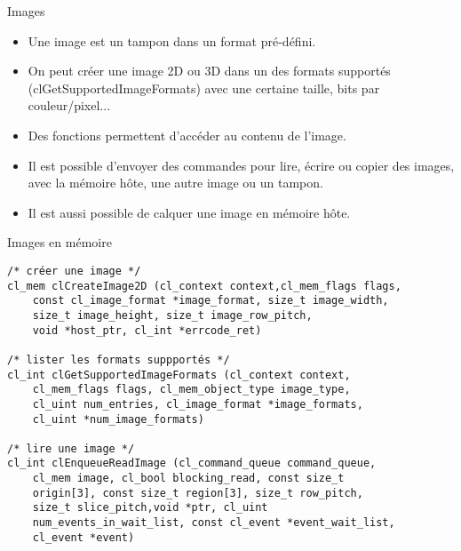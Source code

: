 \documentclass[10pt]{beamer}
\begin{document}
\begin{frame}{Images}

  \begin{itemize}
    \item Une image est un tampon dans un format pré-défini.

    \item On peut créer une image 2D ou 3D dans un des formats supportés (clGetSupportedImageFormats) avec une certaine taille, bits par couleur/pixel...

    \item Des fonctions permettent d'accéder au contenu de l'image.

    \item Il est possible d'envoyer des commandes pour lire, écrire ou copier des images, avec la mémoire hôte, une autre image ou un tampon.

    \item Il est aussi possible de calquer une image en mémoire hôte.
  \end{itemize}
\end{frame}

\begin{frame}[fragile]{Images en mémoire}

  \scriptsize
  \begin{verbatim}
/* créer une image */
cl_mem clCreateImage2D (cl_context context,cl_mem_flags flags,
    const cl_image_format *image_format, size_t image_width,
    size_t image_height, size_t image_row_pitch, 
    void *host_ptr, cl_int *errcode_ret)

/* lister les formats suppportés */
cl_int clGetSupportedImageFormats (cl_context context,
    cl_mem_flags flags, cl_mem_object_type image_type,
    cl_uint num_entries, cl_image_format *image_formats,
    cl_uint *num_image_formats)

/* lire une image */
cl_int clEnqueueReadImage (cl_command_queue command_queue,
    cl_mem image, cl_bool blocking_read, const size_t
    origin[3], const size_t region[3], size_t row_pitch,
    size_t slice_pitch,void *ptr, cl_uint 
    num_events_in_wait_list, const cl_event *event_wait_list,
    cl_event *event)
  \end{verbatim}
\end{frame}
\end{document}
